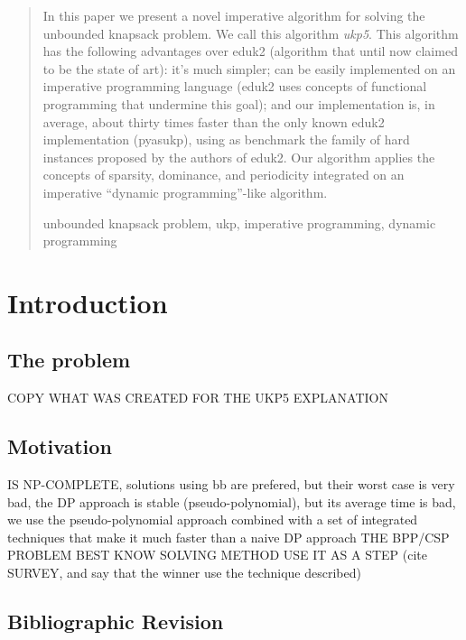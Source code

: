 \documentclass[runningheads,a4paper]{llncs}
\newcommand{\keywords}[1]{\par\addvspace\baselineskip
\noindent\keywordname\enspace\ignorespaces#1}
\begin{document}
\begin{abstract}
In this paper we present a novel imperative algorithm for solving the unbounded knapsack problem. We call this algorithm \emph{ukp5}. This algorithm has the following advantages over eduk2 (algorithm that until now claimed to be the state of art): it's much simpler; can be easily implemented on an imperative programming language (eduk2 uses concepts of functional programming that undermine this goal); and our implementation is, in average, about thirty times faster than the only known eduk2 implementation (pyasukp), using as benchmark the family of hard instances proposed by the authors of eduk2. Our algorithm applies the concepts of sparsity, dominance, and periodicity integrated on an imperative ``dynamic programming''-like algorithm.
\keywords{unbounded knapsack problem, ukp, imperative programming, dynamic programming}
\end{abstract}

\section{Introduction}
\subsection{The problem}
COPY WHAT WAS CREATED FOR THE UKP5 EXPLANATION
\subsection{Motivation}
IS NP-COMPLETE, solutions using bb are prefered, but their worst case is very bad, the DP approach is stable (pseudo-polynomial), but its average time is bad, we use the pseudo-polynomial approach combined with a set of integrated techniques that make it much faster than a naive DP approach
THE BPP/CSP PROBLEM BEST KNOW SOLVING METHOD USE IT AS A STEP (cite SURVEY, and say that the winner use the technique described)
\subsection{Bibliographic Revision}
\end{document}
